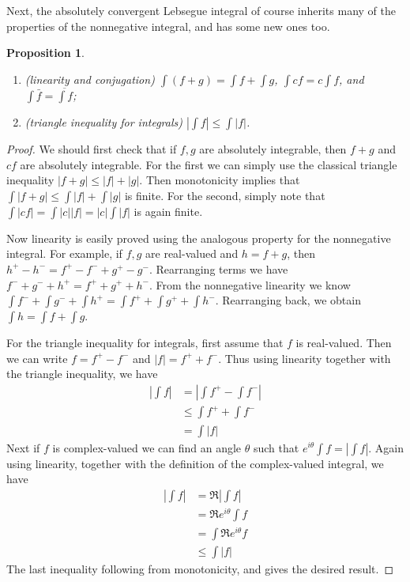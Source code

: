 \documentclass[10pt,oneside]{amsbook}
\theoremstyle{definition}
\theoremstyle{plain}
\newtheorem{prop}[thm]{Proposition}
\theoremstyle{definition}
\theoremstyle{remark}
\numberwithin{equation}{section}
\numberwithin{figure}{section}
\begin{document}
Next, the absolutely convergent Lebsegue integral of course inherits many of the properties of the nonnegative integral, and has some new ones too.

\begin{prop}
  \begin{enumerate}
  \item (linearity and conjugation) $\int(f+g)=\int f+\int g$, $\int cf=c\int f$, and $\int\bar f=\overline{\int f}$;
  \item (triangle inequality for integrals) $\left|\int f\right|\leq\int|f|$.
  \end{enumerate}
\end{prop}

\begin{proof}
  We should first check that if $f,g$ are absolutely integrable, then $f+g$ and $cf$ are absolutely integrable. For the first we can simply use the classical triangle inequality $|f+g|\leq|f|+|g|$. Then monotonicity implies that $\int|f+g|\leq\int|f|+\int|g|$ is finite. For the second, simply note that $\int|cf|=\int|c||f|=|c|\int|f|$ is again finite.

  Now linearity is easily proved using the analogous property for the nonnegative integral. For example, if $f,g$ are real-valued and $h=f+g$, then $h^+-h^-=f^+-f^-+g^+-g^-$. Rearranging terms we have $f^-+g^-+h^+=f^++g^++h^-$. From the nonnegative linearity we know $\int f^-+\int g^-+\int h^+=\int f^++\int g^++\int h^-$. Rearranging back, we obtain $\int h=\int f+\int g$.

  For the triangle inequality for integrals, first assume that $f$ is real-valued. Then we can write $f=f^+-f^-$ and $|f|=f^++f^-$. Thus using linearity together with the triangle inequality, we have
  \begin{align*}
    \left|\int f\right|&=\left|\int f^+-\int f^-\right|\\
                       &\leq\int f^++\int f^-\\
                       &=\int|f|
  \end{align*}
  Next if $f$ is complex-valued we can find an angle $\theta$ such that $e^{i\theta}\int f=\left|\int f\right|$. Again using linearity, together with the definition of the complex-valued integral, we have
  \begin{align*}
    \left|\int f\right|&=\Re\left|\int f\right|\\
                       &=\Re e^{i\theta}\int f\\
                       &=\int \Re e^{i\theta}f\\
                       &\leq\int|f|
  \end{align*}
  The last inequality following from monotonicity, and gives the desired result.
\end{proof}
\end{document}
